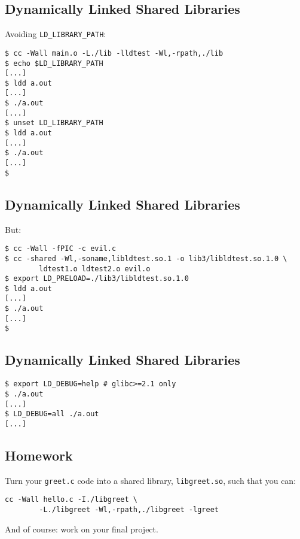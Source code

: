 \documentclass[xga]{xdvislides}
\begin{document}
\subsection{Dynamically Linked Shared Libraries}
Avoiding {\tt LD\_LIBRARY\_PATH}:
\begin{verbatim}
$ cc -Wall main.o -L./lib -lldtest -Wl,-rpath,./lib
$ echo $LD_LIBRARY_PATH
[...]
$ ldd a.out
[...]
$ ./a.out
[...]
$ unset LD_LIBRARY_PATH
$ ldd a.out
[...]
$ ./a.out
[...]
$
\end{verbatim}

\subsection{Dynamically Linked Shared Libraries}
But:
\begin{verbatim}
$ cc -Wall -fPIC -c evil.c
$ cc -shared -Wl,-soname,libldtest.so.1 -o lib3/libldtest.so.1.0 \
        ldtest1.o ldtest2.o evil.o
$ export LD_PRELOAD=./lib3/libldtest.so.1.0
$ ldd a.out
[...]
$ ./a.out
[...]
$
\end{verbatim}

\subsection{Dynamically Linked Shared Libraries}
\begin{verbatim}
$ export LD_DEBUG=help # glibc>=2.1 only
$ ./a.out
[...]
$ LD_DEBUG=all ./a.out
[...]
\end{verbatim}

\subsection{Homework}
Turn your {\tt greet.c} code into a shared library,
{\tt libgreet.so}, such that you can:

\begin{verbatim}
cc -Wall hello.c -I./libgreet \
        -L./libgreet -Wl,-rpath,./libgreet -lgreet
\end{verbatim}

\vspace{1in}
And of course: work on your final project.
\end{document}
